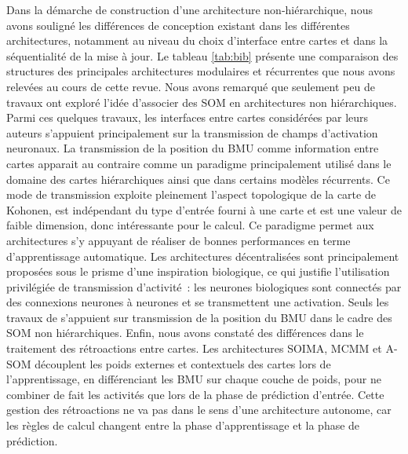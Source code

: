 \documentclass[../main]{subfiles}
\begin{document}
Dans la démarche de construction d'une architecture non-hiérarchique, nous avons souligné les différences de conception existant dans les différentes architectures, notamment au niveau du choix d'interface entre cartes et dans la séquentialité de la mise à jour.
Le tableau \ref{tab:bib} présente une comparaison des structures des principales architectures modulaires et récurrentes que nous avons relevées au cours de cette revue.
Nous avons remarqué que seulement peu de travaux ont exploré l'idée d'associer des SOM en architectures non hiérarchiques. Parmi ces quelques travaux, les interfaces entre cartes considérées par leurs auteurs s'appuient principalement sur la transmission de champs d'activation neuronaux.
La transmission de la position du BMU comme information entre cartes apparait au contraire comme un paradigme principalement utilisé dans le domaine des cartes hiérarchiques ainsi que dans certains modèles récurrents.
Ce mode de transmission exploite pleinement l'aspect topologique de la carte de Kohonen, est indépendant du type d'entrée fourni à une carte et est une valeur de faible dimension, donc intéressante pour le calcul. Ce paradigme permet aux architectures s'y appuyant de réaliser de bonnes performances en terme d'apprentissage automatique.
Les architectures décentralisées sont principalement proposées sous le prisme d'une inspiration biologique, ce qui justifie l'utilisation privilégiée de transmission d'activité~: les neurones biologiques sont connectés par des connexions neurones à neurones et se transmettent une activation. 
Seuls les travaux de \cite{dominey13} s'appuient sur transmission de la position du BMU dans le cadre des SOM non hiérarchiques.
Enfin, nous avons constaté des différences dans le traitement des rétroactions entre cartes. Les architectures SOIMA, MCMM et A-SOM découplent les poids externes et contextuels des cartes lors de l'apprentissage, en différenciant les BMU sur chaque couche de poids, pour ne combiner de fait les activités que lors de la phase de prédiction d'entrée. 
Cette gestion des rétroactions ne va pas dans le sens d'une architecture autonome, car les règles de calcul changent entre la phase d'apprentissage et la phase de prédiction.
\end{document}
